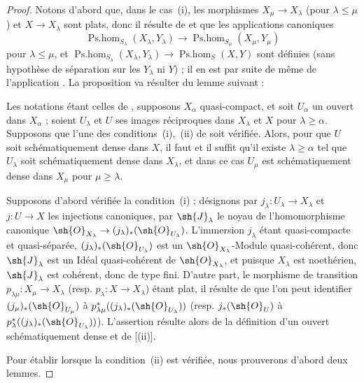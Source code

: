 \begin{proof}
Notons d'abord que, dans le cas~(i), les morphismes $X_\mu\to X_\lambda$ (pour $\lambda\leq\mu$) et $X\to X_\lambda$ sont plats, donc il résulte de  et  que les applications canoniques
\[
  \operatorname{Ps.hom}_{S_\lambda}(X_\lambda,Y_\lambda)\to\operatorname{Ps.hom}_{S_\mu}(X_\mu,Y_\mu)
\]
pour $\lambda\leq\mu$, et $\operatorname{Ps.hom}_{S_\lambda}(X_\lambda,Y_\lambda)\to\operatorname{Ps.hom}_S(X,Y)$ sont définies (sans hypothèse de séparation sur les $Y_\lambda$ ni $Y$) ; il en est par suite de même de l'application .
La proposition va résulter du lemme suivant :

\begin{lemma}[20.3.8.2]
\label{IV.20.3.8.2}
Les notations étant celles de , supposons $X_\alpha$ quasi-compact, et soit $U_\alpha$ un ouvert dans $X_\alpha$ ; soient $U_\lambda$ et $U$ ses images réciproques dans $X_\lambda$ et $X$ pour $\lambda\geq\alpha$.
Supposons que l'une des conditions~(i),~(ii) de  soit vérifiée.
Alors, pour que $U$ soit schématiquement dense dans $X$, il faut et il suffit qu'il existe $\lambda\geq\alpha$ tel que $U_\lambda$ soit schématiquement dense dans $X_\lambda$, et dans ce cas $U_\mu$ est schématiquement dense dans $X_\mu$ pour $\mu\geq\lambda$.
\end{lemma}

Supposons d'abord vérifiée la condition~(i) ; désignons par $j_\lambda:U_\lambda\to X_\lambda$ et $j:U\to X$ les injections canoniques, par $\sh{J}_\lambda$ le noyau de l'homomorphisme canonique $\sh{O}_{X_\lambda}\to(j_\lambda)_*(\sh{O}_{U_\lambda})$.
L'immersion $j_\lambda$ étant quasi-compacte et quasi-séparée, $(j_\lambda)_*(\sh{O}_{U_\lambda})$ est un $\sh{O}_{X_\lambda}$-Module quasi-cohérent, donc $\sh{J}_\lambda$ est un Idéal quasi-cohérent de $\sh{O}_{X_\lambda}$, et puisque $X_\lambda$ est noethérien, $\sh{J}_\lambda$ est cohérent, donc de type fini.
D'autre part, le morphisme de transition $p_{\lambda\mu}:X_\mu\to X_\lambda$ (resp. $p_\lambda:X\to X_\lambda$) étant plat, il résulte de  que l'on peut identifier $(j_\mu)_*(\sh{O}_{U_\mu})$ à $p_{\lambda\mu}^*((j_\lambda)_*(\sh{O}_{U_\lambda}))$ (resp. $j_*(\sh{O}_U)$ à $p_\lambda^*((j_\lambda)_*(\sh{O}_{U_\lambda}))$).
L'assertion résulte alors de la définition d'un ouvert schématiquement dense et de [(ii)].

Pour établir  lorsque la condition~(ii) est vérifiée, nous prouverons d'abord deux lemmes.


\end{proof}
